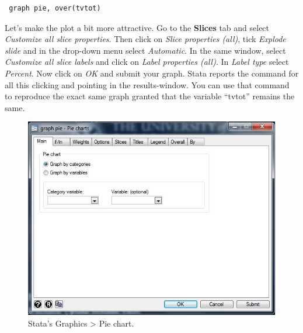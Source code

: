 \begin{lstlisting}
 graph pie, over(tvtot)
\end{lstlisting}

Let's make the plot a bit more attractive. Go to the \textbf{Slices} tab and select \textit{Customize all slice properties}. Then click on \textit{Slice properties (all)}, tick \textit{Explode slide} and in the drop-down menu select \textit{Automatic}. In the same window, select \textit{Customize all slice labels} and click on \textit{Label properties (all)}. In \textit{Label type} select \textit{Percent}. Now click on \textit{OK} and submit your graph. Stata reports the command for all this clicking and pointing in the results-window. You can use that command to reproduce the exact same graph granted that the variable ``tvtot'' remains the same.

\begin{figure}[H]
	\includegraphics[width=\linewidth]{./img/graphics_pie.jpg}
	\caption{Stata's Graphics > Pie chart.}
\end{figure}
